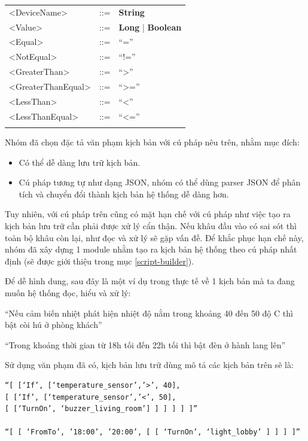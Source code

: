 \documentclass[12pt,a4paper,oneside]{extbook}
\begin{document}
\begin{table}[h]
\begin{tabular}[t]{ |lll| }
	<DeviceName> & ::= & \textbf{String} \\
	
	<Value> & ::= &	\textbf{Long} | \textbf{Boolean} \\
	
	<Equal> & ::= &	“=” \\
	
	<NotEqual> 	& ::= & “!=” \\
	
	<GreaterThan> &	::= & “>” \\
	
	<GreaterThanEqual> & ::= & “>=” \\
	
	<LessThan> 	& ::= & “<” \\
	
	<LessThanEqual>	& ::= & “<=”\\
	&&\\
	\hline
\end{tabular}
\end{table}

Nhóm đã chọn đặc tả văn phạm kịch bản với cú pháp nêu trên, nhằm mục đích:
\begin{itemize}[topsep=1mm,itemsep=-0.5mm]
\item Có thể dễ dàng lưu trữ kịch bản.
\item Cú pháp tương tự như dạng JSON, nhóm có thể dùng parser JSON để phân tích và chuyển đổi thành kịch bản hệ thống dễ dàng hơn.
\vspace{1mm}
\end{itemize}

Tuy nhiên, với cú pháp trên cũng có mặt hạn chế với cú pháp như việc tạo ra kịch bản lưu trữ cần phải được xử lý cẩn thận. Nếu khâu đầu vào có sai sót thì toàn bộ khâu còn lại, như đọc và xử lý sẽ gặp vấn đề. Để khắc phục hạn chế này, nhóm đã xây dựng 1 module nhằm tạo ra kịch bản hệ thống theo cú pháp nhất định (sẽ được giới thiệu trong mục \ref{script-builder}).

Để dễ hình dung, sau đây là một ví dụ trong thực tế về 1 kịch bản mà ta đang muốn hệ thống đọc, hiểu và xử lý:

“Nếu cảm biến nhiệt phát hiện nhiệt độ nằm trong khoảng 40 đến 50 độ C thì bật còi hú ở phòng khách”

“Trong khoảng thời gian từ 18h tối đến 22h tối thì bật đèn ở hành lang lên”

Sử dụng văn phạm đã có, kịch bản lưu trữ dùng mô tả các kịch bản trên sẽ là:
\begin{verbatim}
“[ [‘If’, [‘temperature_sensor’,’>’, 40], 
[ [‘If’, [‘temperature_sensor’,’<’, 50], 
[ [‘TurnOn’, ‘buzzer_living_room’] ] ] ] ] ]”

“[ [ ‘FromTo’, ’18:00’, ’20:00’, [ [ ‘TurnOn’, ‘light_lobby’ ] ] ] ]”
\end{verbatim}
\end{document}
